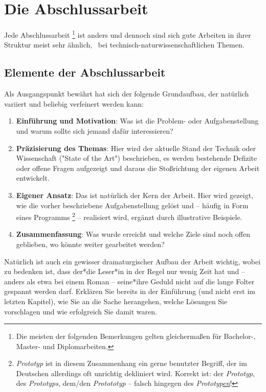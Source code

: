 \chapter{Die Abschlussarbeit}
\label{cha:Abschlussarbeit}

Jede Abschlussarbeit%
\footnote{Die meisten der folgenden Bemerkungen gelten gleichermaßen für
Bachelor-, Master- und Diplomarbeiten.}
ist anders und dennoch sind sich gute Arbeiten in ihrer Struktur meist sehr
ähnlich, \va\ bei technisch-natur\-wissen\-schaft\-lichen Themen.

\section{Elemente der Abschlussarbeit}

Als Ausgangspunkt bewährt hat sich der folgende Grundaufbau, der natürlich 
vari\-iert und beliebig verfeinert werden kann:
%
\begin{enumerate}
    \item \textbf{Einführung und Motivation}: Was ist die Problem- oder
    Aufgabenstellung und
    warum sollte sich jemand dafür interessieren?
    \item \textbf{Präzisierung des Themas}: Hier wird der aktuelle Stand der
    Technik oder Wissenschaft ("State of the Art") beschrieben, es werden
    bestehende Defizite oder offene Fragen aufgezeigt und daraus die
    Stoßrichtung der eigenen Arbeit entwickelt.
    \item \textbf{Eigener Ansatz}: Das ist natürlich der Kern der Arbeit. Hier
    wird gezeigt, wie die vorher beschriebene Aufgabenstellung gelöst und --
    häufig in Form eines Programms%
    \footnote{\emph{Prototyp} ist in diesem Zusammenhang ein gerne benutzter
    Begriff, der im Deutschen allerdings oft unrichtig dekliniert wird.
    Korrekt ist: der \emph{Prototyp}, des \emph{Prototyps}, dem/den
    \emph{Protototyp} -- falsch hingegen des \emph{Prototyp\underline{en}}!}
    -- realisiert wird, ergänzt durch illustrative Beispiele.
    \item \textbf{Zusammenfassung}: Was wurde erreicht und welche Ziele sind
    noch offen geblieben, wo könnte weiter gearbeitet werden?
\end{enumerate}
%
Natürlich ist auch ein gewisser dramaturgischer Aufbau der Arbeit wichtig,
wobei zu bedenken ist, dass der*die Leser*in in der Regel nur wenig Zeit hat
und -- anders als etwa bei einem Roman -- seine*ihre Geduld nicht auf die
lange Folter gespannt werden darf. Erklären Sie bereits in der Einführung
(und nicht erst im letzten Kapitel), wie Sie an die Sache herangehen, welche
Lösungen Sie vorschlagen und wie erfolgreich Sie damit waren.

